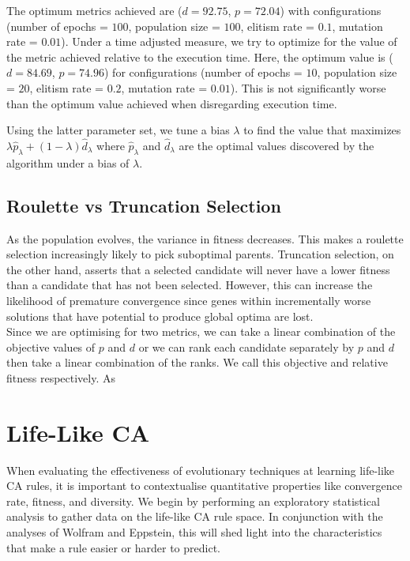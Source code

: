The optimum metrics achieved are ($d=92.75$, $p=72.04$) with configurations (number of epochs = $100$, population size = $100$, elitism rate = $0.1$, mutation rate = $0.01$). Under a time adjusted measure, we try to optimize for the value of the metric achieved relative to the execution time. Here, the optimum value is ($d=84.69$, $p=74.96$) for configurations (number of epochs = $10$, population size = $20$, elitism rate = $0.2$, mutation rate = $0.01$). This is not significantly worse than the optimum value achieved when disregarding execution time.

Using the latter parameter set, we tune a bias $\lambda$ to find the value that maximizes $\lambda \hat{p}_\lambda + (1-\lambda)\hat{d}_\lambda$ where $ \hat{p}_\lambda$ and $\hat{d}_\lambda$ are the optimal values discovered by the algorithm under a bias of $\lambda$.\\


\subsection{Roulette vs Truncation Selection}

As the population evolves, the variance in fitness decreases. This makes a roulette selection increasingly likely to pick suboptimal parents. Truncation selection, on the other hand, asserts that a selected candidate will never have a lower fitness than a candidate that has not been selected. However, this can increase the likelihood of premature convergence since genes within incrementally worse solutions that have potential to produce global optima are lost.\\

Since we are optimising for two metrics, we can take a linear combination of the objective values of $p$ and $d$ or we can rank each candidate separately by $p$ and $d$ then take a linear combination of the ranks. We call this objective and relative fitness respectively. As

\section{Life-Like CA}

When evaluating the effectiveness of evolutionary techniques at learning life-like CA rules, it is important to contextualise quantitative properties like convergence rate, fitness, and diversity. We begin by performing an exploratory statistical analysis to gather data on the life-like CA rule space. In conjunction with the analyses of Wolfram\cite{wolfram1986theory} and Eppstein\cite{eppstein2010growth}, this will shed light into the characteristics that make a rule easier or harder to predict.


